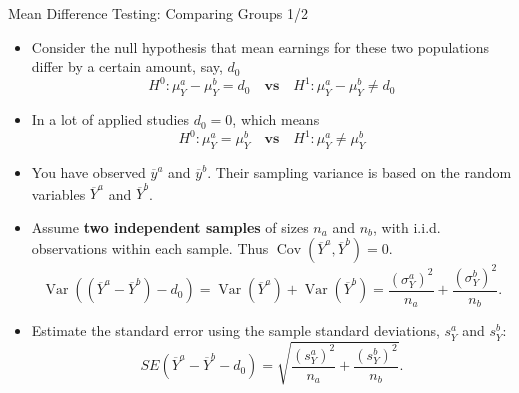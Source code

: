 \documentclass[notes,10pt, aspectratio=169]{beamer}
\begin{document}
\begin{frame}{Mean Difference Testing: Comparing Groups 1/2}
\begin{itemize}
    \item Consider the null hypothesis that mean earnings for these two populations differ by a certain amount, say, $d_0$
    \begin{equation*}
        H^0: \mu_Y^a - \mu_Y^b = d_0 \textbf{~~~vs~~~} H^1: \mu_Y^a - \mu_Y^b \neq d_0
    \end{equation*}
    \item In a lot of applied studies $d_0=0$, which means
        \begin{equation*}
        H^0: \mu_Y^a = \mu_Y^b \textbf{~~~vs~~~} H^1: \mu_Y^a \neq \mu_Y^b
    \end{equation*}
    \item You have observed $\overline{y}^a$ and $\overline{y}^b$. Their sampling variance is based on the random variables $\overline{Y}^a$ and $\overline{Y}^b$.
    \item Assume \textbf{two independent samples} of sizes $n_a$ and $n_b$, with i.i.d. observations within each sample. Thus $\operatorname{Cov}(\overline{Y}^a,\overline{Y}^b)=0$.
    \[
        \operatorname{Var}\!\left((\overline{Y}^a-\overline{Y}^b)-d_0\right)
        =\operatorname{Var}(\overline{Y}^a)+\operatorname{Var}(\overline{Y}^b)
        =\frac{(\sigma_Y^a)^2}{n_a}+\frac{(\sigma_Y^b)^2}{n_b}.
    \]
    \item Estimate the standard error using the sample standard deviations, $s_Y^a$ and $s_Y^b$:
    \[
        SE(\overline{Y}^a-\overline{Y}^b-d_0)
        =\sqrt{\frac{(s_Y^a)^2}{n_a}+\frac{(s_Y^b)^2}{n_b}}.
    \]

\end{itemize}
\end{frame}
\end{document}
